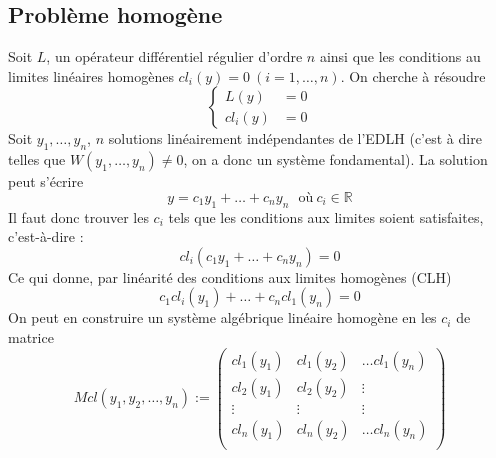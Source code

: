 \documentclass[11pt, a4paper, openany]{book}
\begin{document}
		\subsection{Problème homogène}
		Soit $L$, un opérateur différentiel régulier d'ordre $n$ ainsi que les conditions au limites linéaires homogènes $cl_i(y) =0\ (i=1,\dots,n)$. On cherche à résoudre
		\begin{equation}
			\left\{\begin{array}{ll}
			L(y) &=0\\
			cl_i(y) &= 0
			\end{array}\right.
		\end{equation}
		Soit $y_1,\dots,y_n$, $n$ solutions linéairement indépendantes de l'EDLH (c'est à dire telles que $W(y_1,\dots,y_n)\neq 0$, on a donc un système fondamental). La solution peut s'écrire
		\begin{equation}
			y = c_1y_1 + \dots + c_ny_n\ \ \ \text{où}\ c_i \in \mathbb{R}
		\end{equation}
		Il faut donc trouver les $c_i$ tels que les conditions aux limites soient satisfaites, c'est-à-dire :
		\begin{equation}
			cl_i(c_1y_1 + \dots + c_ny_n) = 0
		\end{equation}
		Ce qui donne, par linéarité des conditions aux limites homogènes (CLH)
		\begin{equation}
			c_1cl_i(y_1) + \dots + c_ncl_1(y_n) = 0
		\end{equation}
		On peut en construire un système algébrique linéaire homogène en les $c_i$ de matrice
		\begin{equation}
			Mcl(y_1, y_2, \dots, y_n) := \left(\begin{array}{ccc}
			cl_1(y_1) & cl_1(y_2) & \dots cl_1(y_n)\\
			cl_2(y_1) & cl_2(y_2) & \vdots\\
			\vdots & \vdots & \vdots \\
			cl_n(y_1) & cl_n(y_2) & \dots cl_n(y_n)\\
			\end{array}\right)
		\end{equation}
									
									
\end{document}
